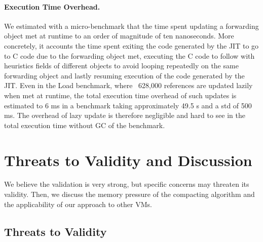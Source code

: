 \documentclass[sigplan,10pt,screen]{acmart}\settopmatter{printfolios=true,printccs=true,printacmref=true}
\begin{document}
\paragraph{Execution Time Overhead.} We estimated with a micro-benchmark that the time spent updating a forwarding object met at runtime to an order of magnitude of ten nanoseconds. More concretely, it  accounts the time spent exiting the code generated by the JIT to go to C code due to the forwarding object met, executing the C code to follow with heuristics fields of different objects to avoid looping repeatedly on the same forwarding object and lastly resuming execution of the code generated by the JIT. Even in the Load benchmark, where ~628,000 references are updated lazily when met at runtime, the total execution time overhead of such updates is estimated to 6 ms in a benchmark taking approximately 49.5 s and a std of 500 ms. The overhead of lazy update is therefore negligible and hard to see in the total execution time without GC of the benchmark.


\section{Threats to Validity and Discussion}
\label{sec:threats}

We believe the validation is very strong, but specific concerns may threaten its validity. %
Then, we discuss the memory pressure of the compacting algorithm and the applicability of our approach to other VMs.

\subsection{Threats to Validity}
\end{document}
